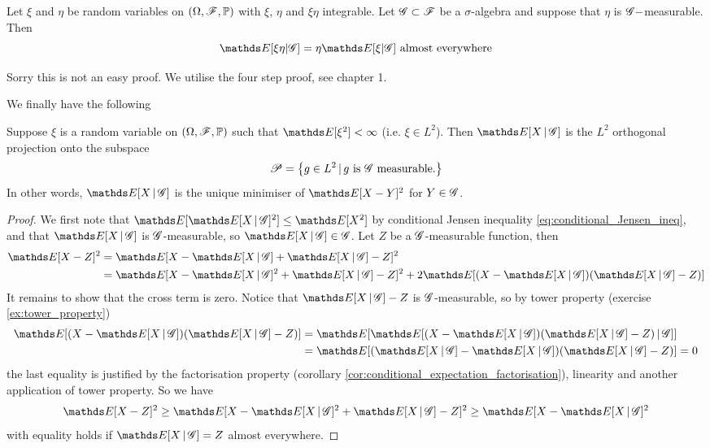 \begin{corollary}[V. Factorisation] \label{cor:conditional_expectation_factorisation}
Let $\xi$ and $\eta$ be random variables on $(\Omega, \mathcal{F}, \mathbb{P})$ with $\xi$, $\eta$ and $\xi \eta $ integrable. Let $\mathcal{G} \subset \mathcal{F}$ be  a $\sigma$-algebra and suppose that $\eta$ is $\mathcal{G}-$measurable. Then
\begin{equation}
	\E[\xi \eta | \G] = \eta \E[\xi | \G] \text{ almost everywhere}
\end{equation}
\end{corollary}

\begin{hint}
Sorry this is not an easy proof. We utilise the four step proof, see chapter 1.
\end{hint}

We finally have the following
\begin{proposition} \label{prop:conditional_expectation_proj}
Suppose $\xi$ is a random variable on $(\Omega,\mathcal{F},\mathbb{P})$ such that $\E[\xi^2] < \infty$ (i.e. $\xi \in L^2$). Then $\E[X\,|\,\G]$ is the $L^2$ orthogonal projection onto the subspace 
\begin{equation}
\mathcal{P} = \left\{ g \in L^2 \,|\, g \text{ is }\mathcal{G}\text{ measurable.} \right \}
\end{equation}
In other words, $\E[X\,|\,\G]$ is the unique minimiser of $\E[X-Y]^2$ for $Y \in \mathcal{G}$.
\end{proposition}

\begin{proof}
We first note that $\E[\E[X\,|\,\G]^2] \leq \E[X^2]$ by conditional Jensen inequality \eqref{eq:conditional_Jensen_ineq}, and that $\E[X\,|\,\G]$ is $\mathcal{G}$-measurable, so $\E[X\,|\,\G] \in \G$. Let $Z$ be a $\mathcal{G}$-measurable function, then \begin{align*}
    \E[X-Z]^2 &= \E[X-\E[X\,|\,\G]+\E[X\,|\,\G]-Z]^2 \\
    &= \E[X-\E[X\,|\,\G]^2 + \E[X\,|\,\G]-Z]^2 + 2\E[(X-\E[X\,|\,\G])(\E[X\,|\,\G]-Z)]
\end{align*}
It remains to show that the cross term is zero. Notice that $\E[X\,|\,\G]-Z$ is $\mathcal{G}$-measurable, so by tower property (exercise \ref{ex:tower_property})
\begin{align*}
    \E[(X-\E[X\,|\,\G])(\E[X\,|\,\G]-Z)] &= \E[\E[(X-\E[X\,|\,\G])(\E[X\,|\,\G]-Z)\,|\, \G]] \\
    &= \E[(\E[X\,|\,\G]-\E[X\,|\,\G])(\E[X\,|\,\G]-Z)] = 0
\end{align*}
the last equality is justified by the factorisation property (corollary \ref{cor:conditional_expectation_factorisation}), linearity and another application of tower property. So we have
\begin{equation}
    \E[X-Z]^2 \geq \E[X-\E[X\,|\,\G]^2 + \E[X\,|\,\G]-Z]^2 \geq \E[X-\E[X\,|\,\G]^2
\end{equation}
with equality holds if $\E[X\,|\,\G]=Z$ almost everywhere.
\end{proof}

